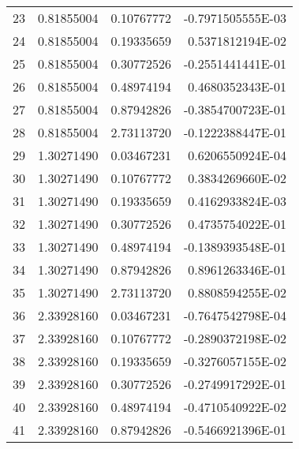 \begin{longtable}{@{\extracolsep{\fill}}cllr@{}}
23  &  0.81855004  &  0.10767772  &  -0.7971505555E-03 \\

24  &  0.81855004  &  0.19335659  &   0.5371812194E-02 \\

25  &  0.81855004  &  0.30772526  &  -0.2551441441E-01 \\

26  &  0.81855004  &  0.48974194  &   0.4680352343E-01 \\

27  &  0.81855004  &  0.87942826  &  -0.3854700723E-01 \\

28  &  0.81855004  &  2.73113720  &  -0.1222388447E-01 \\

29  &  1.30271490  &  0.03467231  &   0.6206550924E-04 \\

30  &  1.30271490  &  0.10767772  &   0.3834269660E-02 \\

31  &  1.30271490  &  0.19335659  &   0.4162933824E-03 \\

32  &  1.30271490  &  0.30772526  &   0.4735754022E-01 \\

33  &  1.30271490  &  0.48974194  &  -0.1389393548E-01 \\

34  &  1.30271490  &  0.87942826  &   0.8961263346E-01 \\

35  &  1.30271490  &  2.73113720  &   0.8808594255E-02 \\

36  &  2.33928160  &  0.03467231  &  -0.7647542798E-04 \\

37  &  2.33928160  &  0.10767772  &  -0.2890372198E-02 \\

38  &  2.33928160  &  0.19335659  &  -0.3276057155E-02 \\

39  &  2.33928160  &  0.30772526  &  -0.2749917292E-01 \\

40  &  2.33928160  &  0.48974194  &  -0.4710540922E-02 \\

41  &  2.33928160  &  0.87942826  &  -0.5466921396E-01 \\


\end{longtable}
